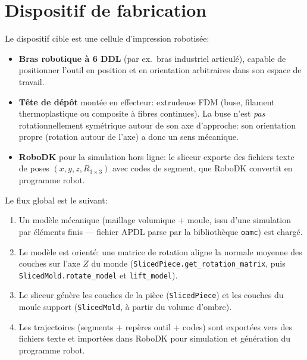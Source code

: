 \documentclass[11pt,a4paper]{article}
\begin{document}
\section{Dispositif de fabrication}\label{sec:setup}

Le dispositif cible est une cellule d'impression robotisée:
\begin{itemize}
  \item \textbf{Bras robotique à 6 DDL} (par ex.\ bras industriel
        articulé), capable de positionner l'outil en position et en
        orientation arbitraires dans son espace de travail.
  \item \textbf{Tête de dépôt} montée en effecteur: extrudeuse FDM
        (buse, filament thermoplastique ou composite à fibres
        continues). La buse n'est \emph{pas} rotationnellement
        symétrique autour de son axe d'approche: son orientation propre
        (rotation autour de l'axe) a donc un sens mécanique.
  \item \textbf{RoboDK} pour la simulation hors ligne: le sliceur
        exporte des fichiers texte de poses $(x,y,z, R_{3\times3})$
        avec codes de segment, que RoboDK convertit en programme
        robot.
\end{itemize}

Le flux global est le suivant:
\begin{enumerate}
  \item Un modèle mécanique (maillage volumique + moule, issu d'une
        simulation par éléments finis --- fichier APDL parse par la
        bibliothèque \texttt{oamc}) est chargé.
  \item Le modèle est orienté: une matrice de rotation aligne la
        normale moyenne des couches sur l'axe $Z$ du monde
        (\texttt{SlicedPiece.get\_rotation\_matrix}, puis
        \texttt{SlicedMold.rotate\_model} et \texttt{lift\_model}).
  \item Le sliceur génère les couches de la pièce
        (\texttt{SlicedPiece}) et les couches du moule support
        (\texttt{SlicedMold}, à partir du volume d'ombre).
  \item Les trajectoires (segments + repères outil + codes) sont
        exportées vers des fichiers texte et importées dans RoboDK
        pour simulation et génération du programme robot.
\end{enumerate}
\end{document}
